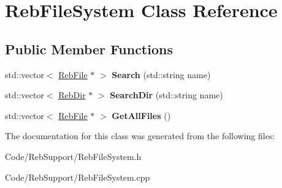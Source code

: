 \hypertarget{class_reb_file_system}{}\section{Reb\+File\+System Class Reference}
\label{class_reb_file_system}
\subsection*{Public Member Functions}
\begin{DoxyCompactItemize}
\item 
std\+::vector$<$ \hyperlink{class_reb_file}{Reb\+File} $\ast$ $>$ {\bfseries Search} (std\+::string name)\hypertarget{class_reb_file_system_af0ea3d08f0799e3fe8e01d2d4ff2b09a}{}\label{class_reb_file_system_af0ea3d08f0799e3fe8e01d2d4ff2b09a}

\item 
std\+::vector$<$ \hyperlink{class_reb_dir}{Reb\+Dir} $\ast$ $>$ {\bfseries Search\+Dir} (std\+::string name)\hypertarget{class_reb_file_system_a3fdfa32965fc99bd3c7e0b6b4c9ebc61}{}\label{class_reb_file_system_a3fdfa32965fc99bd3c7e0b6b4c9ebc61}

\item 
std\+::vector$<$ \hyperlink{class_reb_file}{Reb\+File} $\ast$ $>$ {\bfseries Get\+All\+Files} ()\hypertarget{class_reb_file_system_ab14ac333e7571313c71f6dc6c5783f9e}{}\label{class_reb_file_system_ab14ac333e7571313c71f6dc6c5783f9e}

\end{DoxyCompactItemize}


The documentation for this class was generated from the following files\+:\begin{DoxyCompactItemize}
\item 
Code/\+Reb\+Support/Reb\+File\+System.\+h\item 
Code/\+Reb\+Support/Reb\+File\+System.\+cpp\end{DoxyCompactItemize}
